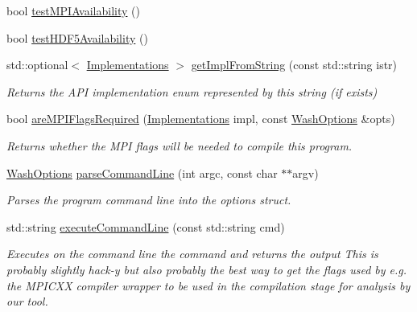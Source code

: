 \begin{DoxyCompactItemize}
\item 
bool \mbox{\hyperlink{namespacews2st_1_1args_a21b8252775215103849faa587d687845}{test\+M\+P\+I\+Availability}} ()
\item 
bool \mbox{\hyperlink{namespacews2st_1_1args_a533a5aab05c3bf24aee0255a7d7a4c91}{test\+H\+D\+F5\+Availability}} ()
\item 
std\+::optional$<$ \mbox{\hyperlink{common_8hpp_aad9d1428f17c06ff77ef15dea22624dc}{Implementations}} $>$ \mbox{\hyperlink{namespacews2st_1_1args_a798dece39be1264d2e1fa55447b8ed2b}{get\+Impl\+From\+String}} (const std\+::string istr)
\begin{DoxyCompactList}\small\item\em Returns the A\+PI implementation enum represented by this string (if exists) \end{DoxyCompactList}\item 
bool \mbox{\hyperlink{namespacews2st_1_1args_afdfeac88d594e9f636a020e576e99505}{are\+M\+P\+I\+Flags\+Required}} (\mbox{\hyperlink{common_8hpp_aad9d1428f17c06ff77ef15dea22624dc}{Implementations}} impl, const \mbox{\hyperlink{structWashOptions}{Wash\+Options}} \&opts)
\begin{DoxyCompactList}\small\item\em Returns whether the M\+PI flags will be needed to compile this program. \end{DoxyCompactList}\item 
\mbox{\hyperlink{structWashOptions}{Wash\+Options}} \mbox{\hyperlink{namespacews2st_1_1args_a31feaff450a079474a31a11a8f45862e}{parse\+Command\+Line}} (int argc, const char $\ast$$\ast$argv)
\begin{DoxyCompactList}\small\item\em Parses the program command line into the options struct. \end{DoxyCompactList}\item 
std\+::string \mbox{\hyperlink{namespacews2st_1_1args_a66c8edb18aef401f79d0a80ad4f42764}{execute\+Command\+Line}} (const std\+::string cmd)
\begin{DoxyCompactList}\small\item\em Executes on the command line the command and returns the output This is probably slightly hack-\/y but also probably the best way to get the flags used by e.\+g. the M\+P\+I\+C\+XX compiler wrapper to be used in the compilation stage for analysis by our tool. \end{DoxyCompactList}\end{DoxyCompactItemize}



